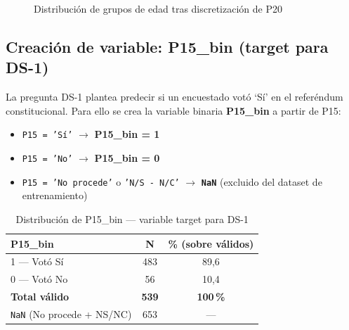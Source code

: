 \documentclass[12pt,a4paper]{article}
\newcommand{\thead}[1]{\cellcolor{tableheader}\color{white}\textbf{#1}}
\begin{document}
\begin{figure}[H]
\centering
{}
\caption{Distribución de grupos de edad tras discretización de P20}
\end{figure}

\subsection{Creación de variable: P15\_bin (target para DS-1)}

La pregunta DS-1 plantea predecir si un encuestado votó `Sí' en el referéndum constitucional. Para ello se crea la variable binaria \textbf{P15\_bin} a partir de P15:

\begin{itemize}[leftmargin=1.8em]
  \item \texttt{P15 = 'Sí'} $\rightarrow$ \textbf{P15\_bin = 1}
  \item \texttt{P15 = 'No'} $\rightarrow$ \textbf{P15\_bin = 0}
  \item \texttt{P15 = 'No procede'} o \texttt{'N/S - N/C'} $\rightarrow$ \textbf{\texttt{NaN}} (excluido del dataset de entrenamiento)
\end{itemize}

\begin{table}[H]
\centering
\renewcommand{\arraystretch}{1.3}
\begin{tabular}{lcc}
\toprule
\thead{P15\_bin} & \thead{N} & \thead{\% (sobre válidos)} \\
\midrule
1 — Votó Sí & 483 & 89,6 \\
\rowcolor{tablerow}
0 — Votó No  &  56 & 10,4 \\
\midrule
\textbf{Total válido} & \textbf{539} & \textbf{100\,\%} \\
\rowcolor{tablerow}
\texttt{NaN} (No procede + NS/NC) & 653 & --- \\
\bottomrule
\end{tabular}
\caption{Distribución de P15\_bin — variable target para DS-1}
\end{table}
\end{document}
